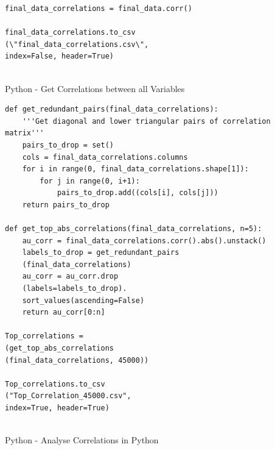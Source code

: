 \documentclass[12pt]{scrartcl}
\begin{document}
\begin{listing}[H]
\begin{verbatim}
final_data_correlations = final_data.corr()

final_data_correlations.to_csv
(\"final_data_correlations.csv\", 
index=False, header=True)


\end{verbatim}
\caption{Python - Get Correlations between all Variables}
\label{list:[Python - Get Correlations between all Variables]}
\end{listing}

\begin{listing}[H]
\begin{verbatim}
def get_redundant_pairs(final_data_correlations):
    '''Get diagonal and lower triangular pairs of correlation matrix'''
    pairs_to_drop = set()
    cols = final_data_correlations.columns
    for i in range(0, final_data_correlations.shape[1]):
        for j in range(0, i+1):
            pairs_to_drop.add((cols[i], cols[j]))
    return pairs_to_drop
    
def get_top_abs_correlations(final_data_correlations, n=5):
    au_corr = final_data_correlations.corr().abs().unstack()
    labels_to_drop = get_redundant_pairs
    (final_data_correlations)
    au_corr = au_corr.drop
    (labels=labels_to_drop).
    sort_values(ascending=False)
    return au_corr[0:n]
    
Top_correlations = 
(get_top_abs_correlations
(final_data_correlations, 45000))

Top_correlations.to_csv
("Top_Correlation_45000.csv", 
index=True, header=True)


\end{verbatim}
\caption{Python - Analyse Correlations in Python}
\label{list:[Python - Analyse Correlations in Python]}
\end{listing}



\end{document}
